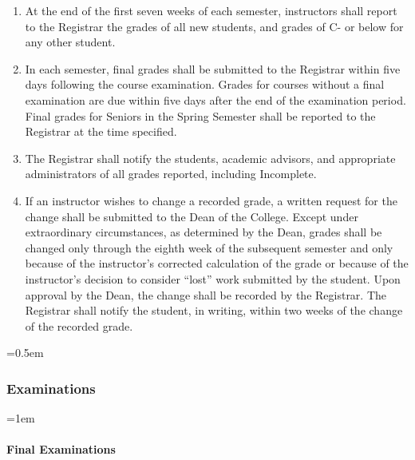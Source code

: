 \documentclass{manual}
\let\oldsubsubsection\subsubsection
\renewcommand\subsubsection{\leftskip=0.5em\oldsubsubsection}
\let\oldparagraph\paragraph
\renewcommand\paragraph{\leftskip=1em\oldparagraph}
\newcommand{\itemLevelA}{\alph*.}
\newcommand{\itemLevelB}{\arabic*)}
\newcommand{\itemRefA}{\alph*}
\newcommand{\itemRefB}{\arabic*}
\begin{document}
\begin{enumerate}[label=\itemLevelA,ref=\itemRefA]
					\begin{enumerate}[label=\itemLevelB,ref=\itemRefB]
					\item At the end of the first seven weeks of each semester, instructors shall report to the Registrar the grades of all new students, and grades of C- or below for any other student.
					\item  In each semester, final grades shall be submitted  to the Registrar within five days following the course examination. Grades for courses without a final examination are due within five days after the end of the examination period. Final grades for Seniors in the Spring Semester shall be reported to the Registrar at the time specified.
					\item  The Registrar shall notify the students, academic advisors, and appropriate administrators of all grades reported, including Incomplete. 
					\item  If an instructor wishes to change a recorded grade,  a written request for the change shall be submitted to the Dean of the College. Except under extraordinary circumstances, as determined by the Dean, grades shall be changed only through the eighth week of the subsequent semester and only because of the instructor's corrected calculation of the grade or because of the instructor's decision to consider ``lost'' work submitted by the student. Upon approval by the Dean, the change shall be recorded by the Registrar. The Registrar shall notify the student, in writing, within two weeks of the change of the recorded grade.
					\end{enumerate}
				
				\end{enumerate}

		\subsubsection{Examinations}

			\paragraph{Final Examinations}
\end{document}
